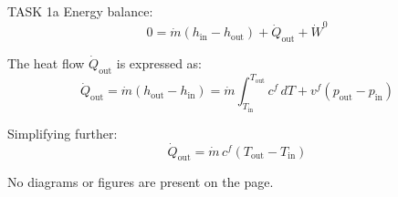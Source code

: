 TASK 1a  
Energy balance:  
\[
0 = \dot{m} (h_{\text{in}} - h_{\text{out}}) + \dot{Q}_{\text{out}} + \dot{W}^0
\]  

The heat flow \( \dot{Q}_{\text{out}} \) is expressed as:  
\[
\dot{Q}_{\text{out}} = \dot{m} (h_{\text{out}} - h_{\text{in}}) = \dot{m} \int_{T_{\text{in}}}^{T_{\text{out}}} c^f \, dT + v^f (p_{\text{out}} - p_{\text{in}})
\]  

Simplifying further:  
\[
\dot{Q}_{\text{out}} = \dot{m} \, c^f (T_{\text{out}} - T_{\text{in}})
\]  

No diagrams or figures are present on the page.
